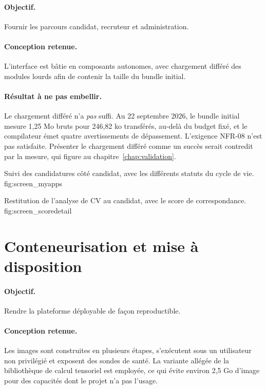 \paragraph{Objectif.} Fournir les parcours candidat, recruteur et
administration.

\paragraph{Conception retenue.} L'interface est bâtie en composants autonomes,
avec chargement différé des modules lourds afin de contenir la taille du bundle
initial.

\paragraph{Résultat à ne pas embellir.} Le chargement différé n'a \emph{pas}
suffi. Au 22 septembre 2026, le bundle initial mesure 1,25 Mo bruts pour
246,82 ko transférés, au-delà du budget fixé, et le compilateur émet quatre
avertissements de dépassement. L'exigence NFR-08 n'est pas satisfaite. Présenter
le chargement différé comme un succès serait contredit par la mesure, qui
figure au chapitre~\ref{chap:validation}.

  {Suivi des candidatures côté candidat, avec les différents statuts du cycle
   de vie.}
  {fig:screen_myapps}

  {Restitution de l'analyse de CV au candidat, avec le score de
   correspondance.}
  {fig:screen_scoredetail}

\section{Conteneurisation et mise à disposition}
\label{sec:impl_packaging}

\paragraph{Objectif.} Rendre la plateforme déployable de façon reproductible.

\paragraph{Conception retenue.} Les images sont construites en plusieurs
étapes, s'exécutent sous un utilisateur non privilégié et exposent des sondes
de santé. La variante allégée de la bibliothèque de calcul tensoriel est
employée, ce qui évite environ 2,5 Go d'image pour des capacités dont le projet
n'a pas l'usage.

